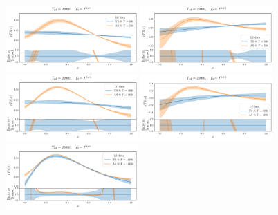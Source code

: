   \begin{figure}[ht!]
    \centering
    \includegraphics[width=0.45\textwidth]{plots/analytical_solution/xT3/evolution/tr_vs_an/L0/linear/evolution_vs_trained_epoch_500_L0_linear.pdf} \hspace{10mm}
    \includegraphics[width=0.45\textwidth]{plots/analytical_solution/xT3/evolution/tr_vs_an/L2/linear/evolution_vs_trained_epoch_500_L2_linear.pdf}
    \includegraphics[width=0.45\textwidth]{plots/analytical_solution/xT3/evolution/tr_vs_an/L0/linear/evolution_vs_trained_epoch_1000_L0_linear.pdf} \hspace{10mm}
    \includegraphics[width=0.45\textwidth]{plots/analytical_solution/xT3/evolution/tr_vs_an/L2/linear/evolution_vs_trained_epoch_1000_L2_linear.pdf}
    \includegraphics[width=0.45\textwidth]{plots/analytical_solution/xT3/evolution/tr_vs_an/L0/linear/evolution_vs_trained_epoch_10000_L0_linear.pdf} \hspace{10mm}

\end{figure}
